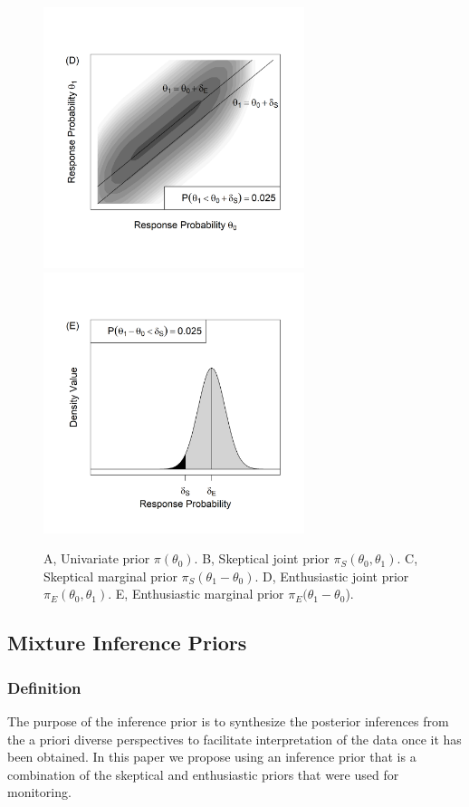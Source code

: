 \documentclass[12pt]{article}
\begin{document}
\begin{figure}
\begin{center}
\includegraphics[width=3in]{./FIGURES/figure5b.png}
\includegraphics[width=3in]{./FIGURES/figure5e.png}
\caption{A, Univariate prior $\pi(\theta_0)$. B, Skeptical joint prior $\pi_S(\theta_0,\theta_1)$. C, Skeptical marginal prior $\pi_S(\theta_1-\theta_0)$. D, Enthusiastic joint prior $\pi_E(\theta_0,\theta_1)$. E, Enthusiastic marginal prior $\pi_E(\theta_1-\theta_0$).}
\label{fig:figure5}
 \end{center}\end{figure}
\subsection{Mixture Inference Priors}
\subsubsection{Definition}
The purpose of the inference prior is to synthesize the posterior inferences from the a priori diverse perspectives to facilitate interpretation of the data once it has been obtained. In this paper we propose using an inference prior that is a combination of the skeptical and enthusiastic priors that were used for monitoring.
\end{document}
